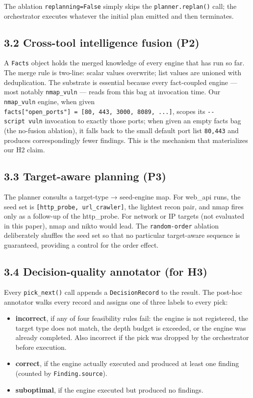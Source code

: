 \documentclass[
]{article}
\providecommand{\tightlist}{%
  \setlength{\itemsep}{0pt}\setlength{\parskip}{0pt}}
\begin{document}
The ablation \texttt{replanning=False} simply skips the
\texttt{planner.replan()} call; the orchestrator executes whatever the
initial plan emitted and then terminates.

\subsection{3.2 Cross-tool intelligence fusion
(P2)}\label{cross-tool-intelligence-fusion-p2}

A \texttt{Facts} object holds the merged knowledge of every engine that
has run so far. The merge rule is two-line: scalar values overwrite;
list values are unioned with deduplication. The substrate is essential
because every fact-coupled engine --- most notably \texttt{nmap\_vuln}
--- reads from this bag at invocation time. Our \texttt{nmap\_vuln}
engine, when given
\texttt{facts{[}"open\_ports"{]}\ =\ {[}80,\ 443,\ 3000,\ 8089,\ ...{]}},
scopes its \texttt{-\/-script\ vuln} invocation to exactly those ports;
when given an empty facts bag (the no-fusion ablation), it falls back to
the small default port list \texttt{80,443} and produces correspondingly
fewer findings. This is the mechanism that materializes our H2 claim.

\subsection{3.3 Target-aware planning
(P3)}\label{target-aware-planning-p3}

The planner consults a target-type → seed-engine map. For web\_api runs,
the seed set is \texttt{{[}http\_probe,\ url\_crawler{]}}, the lightest
recon pair, and nmap fires only as a follow-up of the http\_probe. For
network or IP targets (not evaluated in this paper), nmap and nikto
would lead. The \texttt{random-order} ablation deliberately shuffles the
seed set so that no particular target-aware sequence is guaranteed,
providing a control for the order effect.

\subsection{3.4 Decision-quality annotator (for
H3)}\label{decision-quality-annotator-for-h3}

Every \texttt{pick\_next()} call appends a \texttt{DecisionRecord} to
the result. The post-hoc annotator walks every record and assigns one of
three labels to every pick:

\begin{itemize}
\tightlist
\item
  \textbf{incorrect}, if any of four feasibility rules fail: the engine
  is not registered, the target type does not match, the depth budget is
  exceeded, or the engine was already completed. Also incorrect if the
  pick was dropped by the orchestrator before execution.
\item
  \textbf{correct}, if the engine actually executed and produced at
  least one finding (counted by \texttt{Finding.source}).
\item
  \textbf{suboptimal}, if the engine executed but produced no findings.
\end{itemize}
\end{document}
